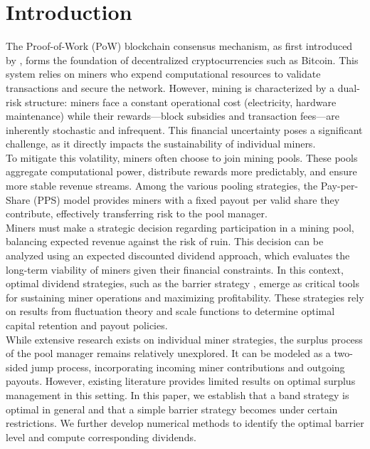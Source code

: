 

\section{Introduction}\label{sec:introduction}




The Proof-of-Work (PoW) blockchain consensus mechanism, as first introduced by \citet{nakamoto2008bitcoin}, forms the foundation of decentralized cryptocurrencies such as Bitcoin. This system relies on miners who expend computational resources to validate transactions and secure the network. However, mining is characterized by a dual-risk structure: miners face a constant operational cost (electricity, hardware maintenance) while their rewards---block subsidies and transaction fees---are inherently stochastic and infrequent. This financial uncertainty poses a significant challenge, as it directly impacts the sustainability of individual miners.\\


\noindent To mitigate this volatility, miners often choose to join mining pools. These pools aggregate computational power, distribute rewards more predictably, and ensure more stable revenue streams. Among the various pooling strategies, the Pay-per-Share (PPS) model \citep{albrecher2022blockchain,schrijvers2016incentive,rosenfeld2011analysis} provides miners with a fixed payout per valid share they contribute, effectively transferring risk to the pool manager.\\


\noindent Miners must make a strategic decision regarding participation in a mining pool, balancing expected revenue against the risk of ruin. This decision can be analyzed using an expected discounted dividend approach, which evaluates the long-term viability of miners given their financial constraints. In this context, optimal dividend strategies, such as the barrier strategy \citep{avanzi2007optimal}, emerge as critical tools for sustaining miner operations and maximizing profitability. These strategies rely on results from fluctuation theory and scale functions \citep{bayraktar2013optimal} to determine optimal capital retention and payout policies.\\


\noindent While extensive research exists on individual miner strategies, the surplus process of the pool manager remains relatively unexplored. It can be modeled as a two-sided jump process, incorporating incoming miner contributions and outgoing payouts. However, existing literature provides limited results on optimal surplus management in this setting. In this paper, we establish that a band strategy is optimal in general and that a simple barrier strategy becomes under certain restrictions. We further develop numerical methods to identify the optimal barrier level and compute corresponding dividends.\\


